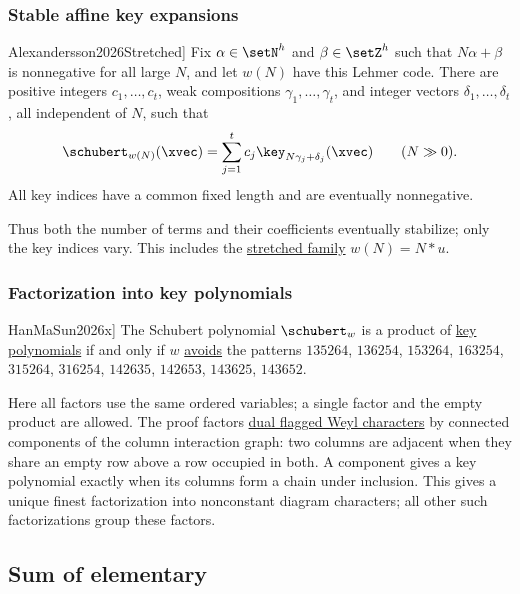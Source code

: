 \subsubsection[schubertStableKeyExpansion]{Stable affine key expansions}

\begin{theorem}[Alexandersson, \cite[Thm.~6.1]{Alexandersson2026Stretched}]
Fix $\alpha\in\setN^h$ and $\beta\in\setZ^h$ such that $N\alpha+\beta$
is nonnegative for all large $N$, and let $w(N)$ have this Lehmer code.
There are positive integers $c_1,\dotsc,c_t$, weak compositions
$\gamma_1,\dotsc,\gamma_t$, and integer vectors $\delta_1,\dotsc,\delta_t$,
all independent of $N$, such that
\[
 \schubert_{w(N)}(\xvec)
 =\sum_{j=1}^t c_j\key_{N\gamma_j+\delta_j}(\xvec)
 \qquad(N\gg0).
\]
All key indices have a common fixed length and are eventually nonnegative.
\end{theorem}

Thus both the number of terms and their coefficients eventually stabilize;
only the key indices vary. This includes the
\hyperref[schubertStretching]{stretched family} $w(N)=N*u$.

\subsubsection[schubertKeyFactorization]{Factorization into key polynomials}

\begin{theorem}[Han--Ma--Sun, \cite[Thm.~1.1]{HanMaSun2026x}]
The Schubert polynomial $\schubert_w$ is a product of
\hyperref[keyProduct]{key polynomials} if and only if $w$
\hyperref[permutationPattern]{avoids} the patterns
$135264$, $136254$, $153264$, $163254$, $315264$, $316254$,
$142635$, $142653$, $143625$, $143652$.
\end{theorem}

Here all factors use the same ordered variables; a single factor and the
empty product are allowed. The proof factors
\hyperref[schubertRepresentationTheory]{dual flagged Weyl characters}
by connected components of the column interaction graph: two columns
are adjacent when they share an empty row above a row occupied in both.
A component gives a key polynomial exactly when its
columns form a chain under inclusion. This gives a unique finest
factorization into nonconstant diagram characters; all other such
factorizations group these factors.

\subsection[schubertAsSumOfElementary]{Sum of elementary}

